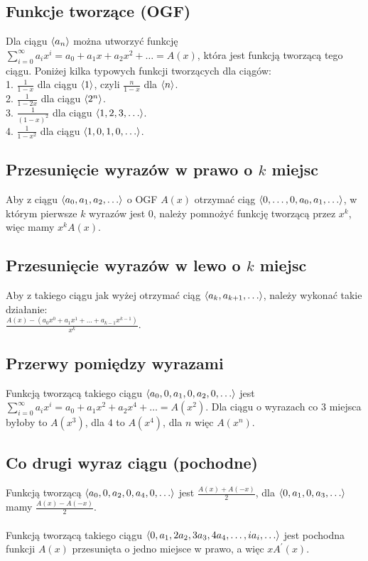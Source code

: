 \subsection*{Funkcje tworzące (OGF)}
Dla ciągu $\left\langle a_n \right\rangle$ można utworzyć funkcję 
$\sum\limits_{i=0}^{\infty} a_i x^i = a_0 + a_1 x + a_2 x^2 + \ldots = A(x)$, która
jest funkcją tworzącą tego ciągu. Poniżej kilka typowych funkcji tworzących dla
ciągów: \\
1. $\frac{1}{1-x}$ dla ciągu $\left\langle 1 \right\rangle$, czyli $\frac{n}{1-x}$ dla $\left\langle n \right\rangle$. \\
2. $\frac{1}{1-2x}$ dla ciągu $\left\langle 2^n \right\rangle$. \\
3. $\frac{1}{(1-x)^2}$ dla ciągu $\left\langle 1, 2, 3, \ldots \right\rangle$. \\
4. $\frac{1}{1-x^2}$ dla ciągu $\left\langle 1, 0, 1, 0, \ldots \right\rangle$. \\

\subsection*{Przesunięcie wyrazów w prawo o $k$ miejsc}
Aby z ciągu $\left\langle a_0, a_1, a_2, \ldots \right\rangle$ o OGF $A(x)$ otrzymać ciąg 
$\left\langle 0, \ldots, 0, a_0, a_1, \ldots \right\rangle$, w którym pierwsze $k$ wyrazów jest $0$,
należy pomnożyć funkcję tworzącą przez $x^k$, więc mamy $x^k A(x)$.

\subsection*{Przesunięcie wyrazów w lewo o $k$ miejsc}
Aby z takiego ciągu jak wyżej otrzymać ciąg $\left\langle a_{k}, a_{k+1}, \ldots \right\rangle$,
należy wykonać takie działanie: \\
$\frac{A(x) - \left( a_0 x^0 + a_1 x^1 + \ldots + a_{k-1} x^{k-1} \right)}{x^k}$.

\subsection*{Przerwy pomiędzy wyrazami}
Funkcją tworzącą takiego ciągu $\left\langle a_0, 0, a_1, 0, a_2, 0, \ldots \right\rangle$ jest
$\sum\limits_{i=0}^{\infty} a_i x^i = a_0 + a_1 x^2 + a_2 x^4 + \ldots = A(x^2)$.
Dla ciągu o wyrazach co $3$ miejsca byłoby to $A(x^3)$, dla $4$ to $A(x^4)$, dla
$n$ więc $A(x^n)$.

\subsection*{Co drugi wyraz ciągu (pochodne)}
Funkcją tworzącą $\left\langle a_0, 0, a_2, 0, a_4, 0, \ldots \right\rangle$ jest 
$\frac{A(x) + A(-x)}{2}$, dla $\left\langle 0, a_1, 0, a_3, \ldots \right\rangle$ mamy
$\frac{A(x) - A(-x)}{2}$. \\ \\
Funkcją tworzącą takiego ciągu 
$\left\langle 0, a_1, 2a_2, 3a_3, 4a_4, \ldots, ia_i, \ldots \right\rangle$
jest pochodna funkcji $A(x)$ przesunięta o jedno miejsce w prawo, a więc $xA^\prime(x)$.

